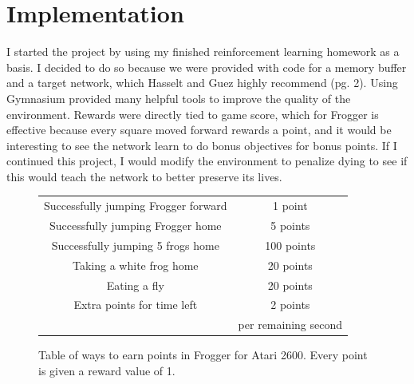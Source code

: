 \documentclass{homework}
\begin{document}
\section{Implementation}
I started the project by using my finished reinforcement learning homework as a basis. I decided to do so because we were provided with code for a memory buffer and a target network, which Hasselt and Guez highly recommend (pg. 2).
Using Gymnasium provided many helpful tools to improve the quality of the environment. Rewards were directly tied to game score, which for Frogger is effective because every square moved forward rewards a point, and it would be interesting to see the network learn to do bonus objectives for bonus points. If I continued this project, I would modify the environment to penalize dying to see if this would teach the network to better preserve its lives.
\begin{figure}[h]
\centering
\begin{tabular}{|c|c|}
\hline

Successfully jumping Frogger forward& 1 point\\
Successfully jumping Frogger home& 5 points \\
Successfully jumping 5 frogs home & 100 points \\
Taking a white frog home& 20 points\\
Eating a fly& 20 points\\
Extra points for time left& 2 points \\
 & per remaining second \\
\hline
\end{tabular}
\caption{Table of ways to earn points in Frogger for Atari 2600. Every point is given a reward value of 1.}
\label{fig:3}
\end{figure}
\end{document}
